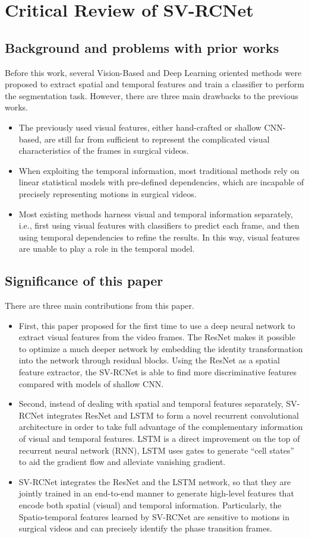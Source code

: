 \documentclass[11pt]{article} \usepackage[top=1in, bottom=1in, left=1in, right=1in]{geometry}
\begin{document}
\section{Critical Review of SV-RCNet}
\subsection{Background and problems with prior works}
Before this work, several Vision-Based and Deep Learning oriented methods were proposed to extract spatial and temporal features and train a classifier to perform the segmentation task. However, there are three main drawbacks to the previous works.  
\begin{itemize}
  \item The previously used visual features, either hand-crafted or shallow CNN-based, are still far from sufficient to represent the complicated visual characteristics of the frames in surgical videos.
  \item When exploiting the temporal information, most traditional methods rely on linear statistical models with pre-defined dependencies, which are incapable of precisely representing motions in surgical videos. 
  \item Most existing methods harness visual and temporal information separately, i.e., first using visual features with classifiers to predict each frame, and then using temporal dependencies to refine the results. In this way, visual features are unable to play a role in the temporal model.
\end{itemize}
\subsection{Significance of this paper}
There are three main contributions from this paper. 
\begin{itemize}
  \item First, this paper proposed for the first time to use a deep neural network to extract visual features from the video frames. The ResNet makes it possible to optimize a much deeper network by embedding the identity transformation into the network through residual blocks. Using the ResNet as a spatial feature extractor, the SV-RCNet is able to find more discriminative features compared with models of shallow CNN. 
  \item Second, instead of dealing with spatial and temporal features separately, SV-RCNet integrates ResNet and LSTM to form a novel recurrent convolutional architecture in order to take full advantage of the complementary information of visual and temporal features. LSTM is a direct improvement on the top of recurrent neural network (RNN), LSTM uses gates to generate “cell states” to aid the gradient flow and alleviate vanishing gradient. 
  \item SV-RCNet integrates the ResNet and the LSTM network, so that they are jointly trained in an end-to-end manner to generate high-level features that encode both spatial (visual) and temporal information. Particularly, the Spatio-temporal features learned by SV-RCNet are sensitive to motions in surgical videos and can precisely identify the phase transition frames. 
\end{itemize}
\end{document}
